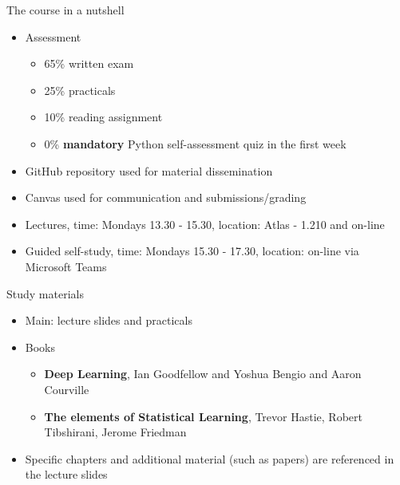 \documentclass[notes]{beamer}          %
\begin{document}
\begin{frame}{The course in a nutshell}
\begin{itemize}
    \item{Assessment}
        \begin{itemize}
            \item 65\% written exam
            \item 25\% practicals
            \item 10\% reading assignment
            \item 0\% \textbf{mandatory} Python self-assessment quiz in the first week
        \end{itemize}
    \item GitHub repository used for material dissemination
    \item Canvas used for communication and submissions/grading
    \item Lectures, time: Mondays 13.30 - 15.30, location: Atlas - 1.210 and on-line
    \item Guided self-study, time: Mondays 15.30 - 17.30, location: on-line via Microsoft Teams
    
\end{itemize}
\end{frame}

\begin{frame}{Study materials}
\begin{itemize}
\item Main: lecture slides and practicals
\item Books
\begin{itemize}
    \item \textbf{Deep Learning}, Ian Goodfellow and Yoshua Bengio and Aaron Courville
    \item \textbf{The elements of Statistical Learning}, Trevor Hastie, Robert Tibshirani, Jerome Friedman
\end{itemize}
\item Specific chapters and additional material (such as papers) are referenced in the lecture slides
\end{itemize}
\end{frame}
\end{document}
